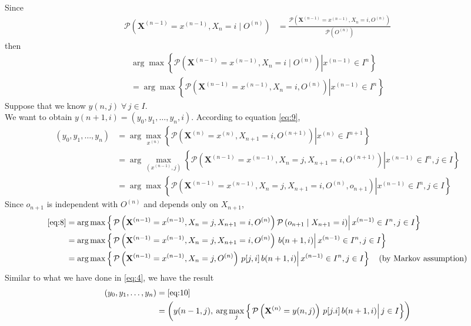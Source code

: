 \documentclass{article}
\begin{document}
$ $\\
Since
\begin{align}
    \mathcal{P}\left(\mathbf{X}^{(n-1)}=x^{(n-1)},X_n=i\mid O^{(n)}\right) &= \frac{\mathcal{P}\left(\mathbf{X}^{(n-1)}=x^{(n-1)},X_n=i, O^{(n)}\right)}{\mathcal{P}(O^{(n)})}
\end{align}
then
\begin{multline}\label{eq:9}
    \arg\max\left\{\left.\mathcal{P}\left(\mathbf{X}^{(n-1)}=x^{(n-1)}, X_n=i\mid O^{(n)}\right)\right| x^{(n-1)}\in I^{n}\right\} \\
    =\arg\max\left\{\left.\mathcal{P}\left(\mathbf{X}^{(n-1)}=x^{(n-1)}, X_n=i, O^{(n)}\right)\right| x^{(n-1)}\in I^{n}\right\} 
\end{multline}
Suppose that we know $y(n,j)\;\forall\,j\in I$. \\
We want to obtain $y(n+1,i)=(y_0,y_1,\dotsc,y_n,i)$. According to equation \eqref{eq:9},
\begin{align}
    (y_0,y_1,\dotsc,y_n) &= \arg\max_{x^{(n)}}\left\{\left.\mathcal{P}\left(\mathbf{X}^{(n)}=x^{(n)}, X_{n+1}=i, O^{(n+1)}\right)\right| x^{(n)}\in I^{n+1}\right\} \nonumber\\
    &= \arg\max_{(x^{(n-1)},j)}\left\{\left.\mathcal{P}\left(\mathbf{X}^{(n-1)}=x^{(n-1)}, X_n=j, X_{n+1}=i, O^{(n+1)}\right)\right| x^{(n-1)}\in I^{n}, j\in I\right\} \nonumber\\
    &= \arg\max\left\{\left.\mathcal{P}\left(\mathbf{X}^{(n-1)}=x^{(n-1)}, X_n=j, X_{n+1}=i, O^{(n)},o_{n+1}\right)\right| x^{(n-1)}\in I^{n}, j\in I\right\} \label{eq:8}
\end{align}
Since $o_{n+1}$ is independent with $O^{(n)}$ and depends only on $X_{n+1}$,
\begin{align}
    \eqref{eq:8} &= \arg\max\left\{\left.\mathcal{P}\left(\mathbf{X}^{(n-1)}=x^{(n-1)}, X_n=j, X_{n+1}=i, O^{(n)}\right)\mathcal{P}\left(o_{n+1}\mid X_{n+1}=i\right)\right| x^{(n-1)}\in I^{n}, j\in I\right\} \\
    &= \arg\max\left\{\left.\mathcal{P}\left(\mathbf{X}^{(n-1)}=x^{(n-1)}, X_n=j, X_{n+1}=i, O^{(n)}\right)\,b(n+1,i)\right| x^{(n-1)}\in I^{n}, j\in I\right\} \\
    &= \arg\max\left\{\left.\mathcal{P}\left(\mathbf{X}^{(n-1)}=x^{(n-1)}, X_n=j, O^{(n)}\right)\,p[j,i]\,b(n+1,i) \right| x^{(n-1)}\in I^n, j\in I\right\} \quad\text{(by Markov assumption)} \label{eq:10}
\end{align}
Similar to what we have done in \eqref{eq:4}, we have the result
\begin{align}
    (y_0,y_1,\dotsc,y_n) &= \eqref{eq:10} \\
    &= \left(y(n-1,j), \:\arg\max_{j}\left\{\left.\mathcal{P}\left(\mathbf{X}^{(n)}=y(n,j)\right)\,p[j.i]\,b(n+1,i) \right| j\in I \right\}\right)
\end{align}
\end{document}
